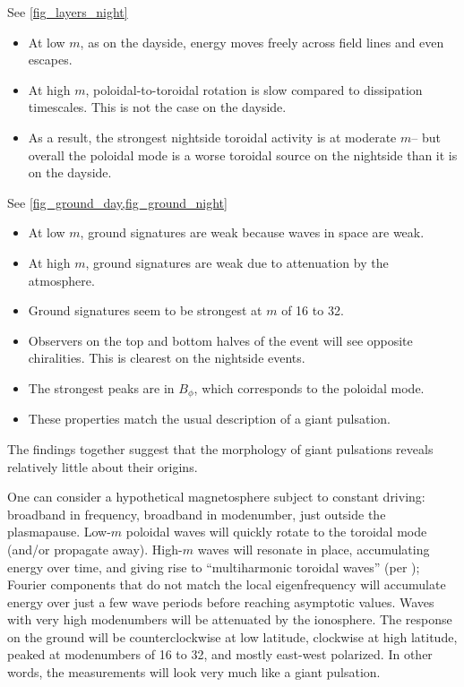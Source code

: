 \documentclass{article}
\newcommand{\azm}{\ensuremath{m}\xspace}
\begin{document}
See \cref{fig_layers_night}

\begin{itemize}
    \item At low \azm, as on the dayside, energy moves freely across field lines and even escapes.
    \item At high \azm, poloidal-to-toroidal rotation is slow compared to dissipation timescales. This is not the case on the dayside.
    \item As a result, the strongest nightside toroidal activity is at moderate \azm -- but overall the poloidal mode is a worse toroidal source on the nightside than it is on the dayside.
\end{itemize}

See \cref{fig_ground_day,fig_ground_night}

\begin{itemize}
    \item At low \azm, ground signatures are weak because waves in space are weak.
    \item At high \azm, ground signatures are weak due to attenuation by the atmosphere.
    \item Ground signatures seem to be strongest at \azm of 16 to 32.
    \item Observers on the top and bottom halves of the event will see opposite chiralities. This is clearest on the nightside events.
    \item The strongest peaks are in $B_\phi$, which corresponds to the poloidal mode.
    \item These properties match the usual description of a giant pulsation.
\end{itemize}

The findings together suggest that the morphology of giant
pulsations reveals relatively little about their origins.

One can consider a hypothetical magnetosphere subject to constant
driving: broadband in frequency, broadband in modenumber, just outside
the plasmapause. Low-\azm poloidal waves will quickly rotate to the
toroidal mode (and/or propagate away). High-\azm waves will resonate in
place, accumulating energy over time, and giving rise to ``multiharmonic
toroidal waves'' (per \cite{takahashi_2011}); Fourier components that do
not match the local eigenfrequency will accumulate energy over just a
few wave periods before reaching asymptotic values. Waves with very high
modenumbers will be attenuated by the ionosphere. The response on the
ground will be counterclockwise at low latitude, clockwise at high
latitude, peaked at modenumbers of 16 to 32, and mostly east-west
polarized. In other words, the measurements will look very much like a
giant pulsation.
\end{document}
